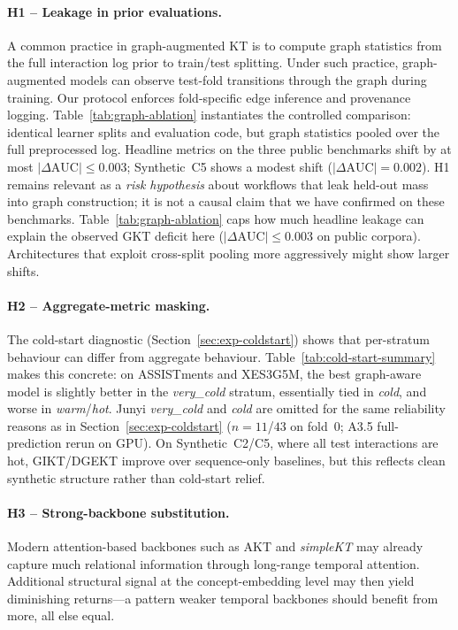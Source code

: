 \documentclass[pdflatex,sn-mathphys-num]{sn-jnl}
\begin{document}
\paragraph{H1 -- Leakage in prior evaluations.}
A common practice in graph-augmented KT is to compute graph statistics
from the full interaction log prior to train/test splitting. Under such
practice, graph-augmented models can observe test-fold transitions through
the graph during training. Our protocol enforces fold-specific edge
inference and provenance logging. Table~\ref{tab:graph-ablation}
instantiates the controlled comparison: identical learner splits and
evaluation code, but graph statistics pooled over the full preprocessed log.
Headline metrics on the three public benchmarks shift by at most
$|\Delta\text{AUC}|{\leq}0.003$; Synthetic~C5 shows a modest shift
($|\Delta\text{AUC}|{=}0.002$). H1 remains relevant as a \emph{risk hypothesis} about workflows that leak
held-out mass into graph construction; it is not a causal claim that we have
confirmed on these benchmarks. Table~\ref{tab:graph-ablation} caps how much
headline leakage can explain the observed GKT deficit here
($|\Delta\text{AUC}|{\leq}0.003$ on public corpora). Architectures that exploit
cross-split pooling more aggressively might show larger shifts.

\paragraph{H2 -- Aggregate-metric masking.}
The cold-start diagnostic (Section~\ref{sec:exp-coldstart}) shows that
per-stratum behaviour can differ from aggregate behaviour.
Table~\ref{tab:cold-start-summary} makes this concrete: on ASSISTments and
XES3G5M, the best graph-aware model is slightly better in the \emph{very\_cold}
stratum, essentially tied in \emph{cold}, and worse in \emph{warm}/\emph{hot}.
Junyi \emph{very\_cold} and \emph{cold} are omitted for the same reliability
reasons as in Section~\ref{sec:exp-coldstart} ($n{=}11$/$43$ on fold~0;
A3.5 full-prediction rerun on GPU). On
Synthetic~C2/C5, where all test interactions are hot, GIKT/DGEKT improve over
sequence-only baselines, but this reflects clean synthetic structure rather
than cold-start relief.

\paragraph{H3 -- Strong-backbone substitution.}
Modern attention-based backbones such as AKT and \textit{simpleKT} may
already capture much relational information through long-range temporal
attention. Additional structural signal at the concept-embedding level may
then yield diminishing returns---a pattern weaker temporal backbones should
benefit from more, all else equal.
\end{document}
